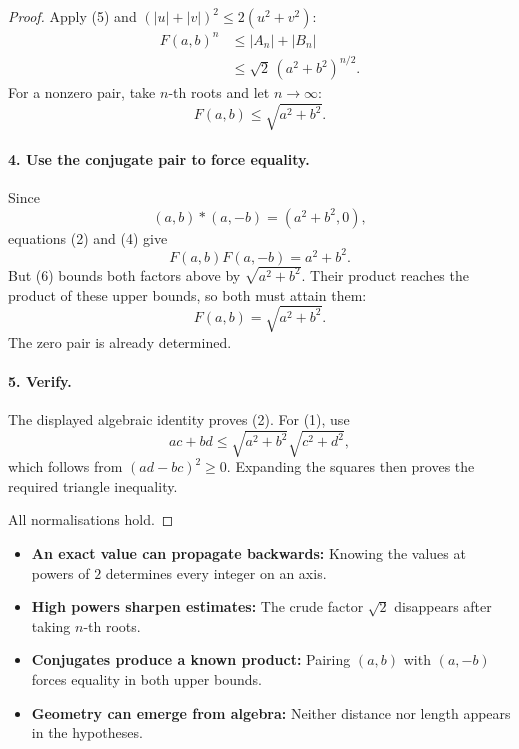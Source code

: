 \begin{dlsummary}[title={\bfseries Solution 63. The Hidden Euclidean Length},breakable]
\begin{proof}
Apply (5) and \((|u|+|v|)^2\le2(u^2+v^2)\):
\[
\begin{aligned}
F(a,b)^n
&\le |A_n|+|B_n|\\
&\le\sqrt2\,(a^2+b^2)^{n/2}.
\end{aligned}
\]
For a nonzero pair, take \(n\)-th roots and let \(n\to\infty\):
\[
\boxed{F(a,b)\le\sqrt{a^2+b^2}.} \tag{6}
\]

\paragraph{4. Use the conjugate pair to force equality.}

Since
\[
(a,b)\ast(a,-b)=(a^2+b^2,0),
\]
equations (2) and (4) give
\[
F(a,b)F(a,-b)=a^2+b^2.
\]
But (6) bounds both factors above by \(\sqrt{a^2+b^2}\). Their product reaches the product of these upper bounds, so both must attain them:
\[
F(a,b)=\sqrt{a^2+b^2}.
\]
The zero pair is already determined.

\paragraph{5. Verify.}

The displayed algebraic identity proves (2). For (1), use
\[
ac+bd\le\sqrt{a^2+b^2}\sqrt{c^2+d^2},
\]
which follows from \((ad-bc)^2\ge0\). Expanding the squares then proves the required triangle inequality.

All normalisations hold.
\end{proof}
\end{dlsummary}

\begin{takeaways}
\begin{itemize}
\item \textbf{An exact value can propagate backwards:} Knowing the values at powers of \(2\) determines every integer on an axis.
\item \textbf{High powers sharpen estimates:} The crude factor \(\sqrt2\) disappears after taking \(n\)-th roots.
\item \textbf{Conjugates produce a known product:} Pairing \((a,b)\) with \((a,-b)\) forces equality in both upper bounds.
\item \textbf{Geometry can emerge from algebra:} Neither distance nor length appears in the hypotheses.
\end{itemize}
\end{takeaways}
